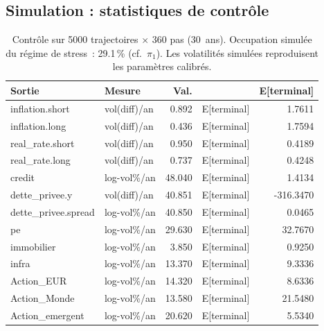 \documentclass[11pt,a4paper]{article}
\theoremstyle{definition}
\begin{document}
\subsection{Simulation : statistiques de contrôle}
\begin{table}[H]\centering\small\renewcommand{\arraystretch}{1.2}\setlength{\tabcolsep}{6pt}
\begin{tabular}{@{}l l r l r@{}}
\toprule
\textbf{Sortie} & \textbf{Mesure} & \textbf{Val.} & \textbf{} & \textbf{E[terminal]}\\
\midrule
inflation.short & vol(diff)/an & 0.892 & E[terminal] & 1.7611\\
inflation.long & vol(diff)/an & 0.436 & E[terminal] & 1.7594\\
real\_rate.short & vol(diff)/an & 0.950 & E[terminal] & 0.4189\\
real\_rate.long & vol(diff)/an & 0.737 & E[terminal] & 0.4248\\
credit & log-vol\%/an & 48.040 & E[terminal] & 1.4134\\
dette\_privee.y & vol(diff)/an & 40.851 & E[terminal] & -316.3470\\
dette\_privee.spread & log-vol\%/an & 40.850 & E[terminal] & 0.0465\\
pe & log-vol\%/an & 29.630 & E[terminal] & 32.7670\\
immobilier & log-vol\%/an & 3.850 & E[terminal] & 0.9250\\
infra & log-vol\%/an & 13.370 & E[terminal] & 9.3336\\
Action\_EUR & log-vol\%/an & 14.320 & E[terminal] & 8.6336\\
Action\_Monde & log-vol\%/an & 13.580 & E[terminal] & 21.5480\\
Action\_emergent & log-vol\%/an & 20.620 & E[terminal] & 5.5340\\
\bottomrule\end{tabular}
\caption{Contrôle sur 5000 trajectoires $\times$ 360 pas (30~ans). Occupation simulée du régime de stress~: 29.1\,\% (cf.\ $\pi_1$). Les volatilités simulées reproduisent les paramètres calibrés.}\label{tab:res-sim}
\end{table}
\end{document}
